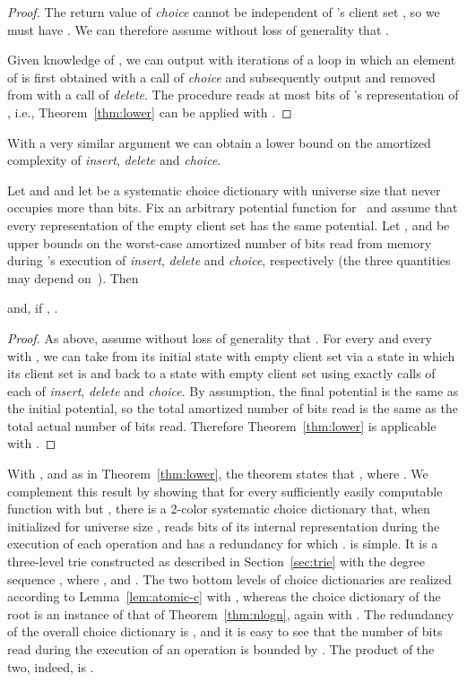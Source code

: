 \documentclass[envcountsame,envcountsect,undated,nolinenumbers]{lnthi}
\def\Tvn#1{\hbox{\textit{#1\/}}}
\begin{document}
\begin{proof}
The return value of \Tvn{choice}
cannot be independent of 's
client set , so we must have
.
We can therefore assume without loss
of generality that .

Given knowledge of
,
we can output  with  iterations of
a loop in which an element of  is first obtained
with a call of \Tvn{choice} and subsequently
output and removed from  with a call of \Tvn{delete}.
The procedure reads at most 
bits of 's representation of , i.e.,
Theorem~\ref{thm:lower} can be applied with
.
\end{proof}

With a very similar argument we can obtain a lower
bound on the amortized complexity of
\Tvn{insert}, \Tvn{delete} and \Tvn{choice}.

\begin{corollary}
Let  and  and let  be a systematic
choice dictionary with universe size  that
never occupies more than  bits.
Fix an arbitrary potential function for~
and assume that every representation of the
empty client set has the same potential.
Let , 
and  be upper bounds
on the worst-case amortized
number of bits read from memory during 's execution of
\Tvn{insert}, \Tvn{delete} and \Tvn{choice}, respectively
(the three quantities may depend on~).
Then

and, if ,
.
\end{corollary}

\begin{proof}
As above, assume without loss of generality that .
For every  and every
 with , we can take 
from its initial state with empty client set
via a state in which its client set is 
and back to a state with empty client set
using exactly  calls of each of
\Tvn{insert}, \Tvn{delete} and \Tvn{choice}.
By assumption, the final potential is the
same as the initial potential, so the total
amortized number of bits read is the same as the
total actual number of bits read.
Therefore Theorem~\ref{thm:lower} is applicable with
.
\end{proof}

With ,  and  as in Theorem~\ref{thm:lower},
the theorem states that ,
where .
We complement this result by showing that for every
sufficiently easily computable
function  with
 but , there is a 2-color
systematic choice dictionary  that, when
initialized for universe size ,
reads  bits of its internal
representation during the execution of each
operation and has a redundancy 
for which .
 is simple.
It is a three-level trie constructed as described
in Section~\ref{sec:trie}
with the degree sequence ,
where , 
and .
The two bottom levels of choice dictionaries are realized
according to Lemma~\ref{lem:atomic-c} with ,
whereas the choice dictionary of the root
is an instance of that of Theorem~\ref{thm:nlogn},
again with .
The redundancy of the overall choice dictionary is
,
and it is easy to see that the number of bits read
during the execution of an operation is bounded by
.
The product of the two, indeed, is
.
\end{document}
